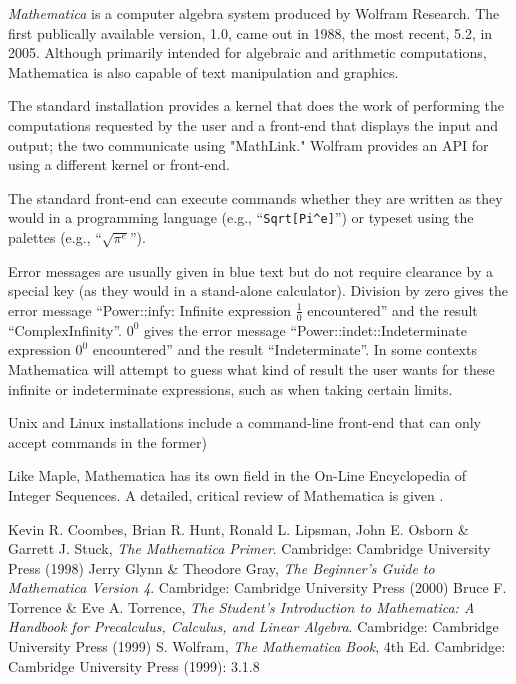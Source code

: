 \documentclass[12pt]{article}
\begin{document}
{\em Mathematica} is a computer algebra system produced by Wolfram Research. The first publically available version, 1.0, came out in 1988, the most recent, 5.2, in 2005. Although primarily intended for algebraic and arithmetic computations, Mathematica is also capable of text manipulation and graphics.

The standard installation provides a kernel that does the work of performing the computations requested by the user and a front-end that displays the input and output; the two communicate using "MathLink." Wolfram provides an API for using a different kernel or front-end. 

The standard front-end can execute commands whether they are written as they would in a programming language (e.g., ``\verb=Sqrt[Pi^e]='') or typeset using the palettes (e.g., ``$\sqrt{ \pi ^e}$'').

Error messages are usually given in blue text but do not require clearance by a special key (as they would in a stand-alone calculator). Division by zero gives the error message ``Power::infy: Infinite expression $\frac{1}{0}$ encountered'' and the result ``ComplexInfinity''. $0^0$ gives the error message ``Power::indet::Indeterminate expression $0^0$ encountered'' and the result ``Indeterminate''. In some contexts Mathematica will attempt to guess what kind of result the user wants for these infinite or indeterminate expressions, such as when taking certain limits.

Unix and Linux installations include a command-line front-end that can only accept commands in the former)

Like Maple, Mathematica has its own field in the On-Line Encyclopedia of Integer Sequences.
A detailed, critical review of Mathematica is given .

\begin{thebibliography}{4}
 Kevin R. Coombes, Brian R. Hunt, Ronald L. Lipsman, John E. Osborn \& Garrett J. Stuck, {\it The Mathematica Primer}. Cambridge: Cambridge University Press (1998)
 Jerry Glynn \& Theodore Gray, {\it The Beginner's Guide to Mathematica Version 4}. Cambridge: Cambridge University Press (2000)
 Bruce F. Torrence \& Eve A. Torrence, {\it The Student's Introduction to Mathematica: A Handbook for Precalculus, Calculus, and Linear Algebra}. Cambridge: Cambridge University Press (1999)
 S. Wolfram, {\it The Mathematica Book}, 4th Ed. Cambridge: Cambridge University Press (1999): 3.1.8
\end{thebibliography}
\end{document}
